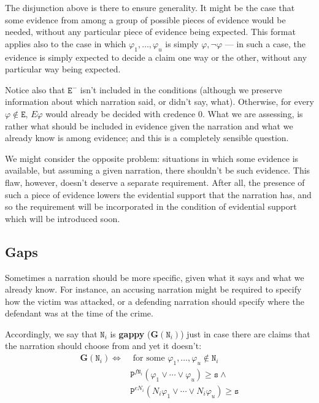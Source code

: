 \documentclass[10pt,leqno]{article}
\newcommand{\n}{\neg}
\begin{document}
The disjunction above is there to ensure generality. It might be the case that some evidence from among a group of possible pieces of evidence would be needed, without any particular piece of evidence being expected. This format applies also to the case in which $\varphi_1, \dots, \varphi_u$ is simply $\varphi, \n \varphi$ --- in such a case, the evidence is simply expected to decide a claim one way or the other, without any particular way being expected.

Notice also that $\mathtt{E}^-$ isn't included in the conditions (although we preserve information about which narration said, or didn't say, what). Otherwise, for every $\varphi\not \in \mathtt{E}$, $E\varphi$ would already be decided with credence 0. What we are assessing, is rather what should be included in evidence given the narration and what we already know is among evidence; and this is a completely sensible question.

We might consider the opposite problem: situations in which some evidence is available, but assuming a given narration, there shouldn't be such evidence. This flaw, however, doesn't deserve a separate requirement. After all, the presence of such a piece of evidence lowers the evidential support that the narration has, and so the requirement will be incorporated in the condition of evidential support which will be introduced soon. 





\subsection{Gaps}


Sometimes a narration should be more specific, given what it says and what we already know. For instance, an accusing narration might be required to specify how the victim was attacked, or a defending narration should specify where the defendant was at the time of the crime. 

 Accordingly, we say that $\mathtt{N}_i$ is \textbf{gappy}  ($\mathbf{G}(\mathtt{N}_i)$)  just in case there are claims that the narration should choose from and yet it doesn't:
\begin{align}
\tag{Gap} \label{Gap}
\mathbf{G}(\mathtt{N}_i)  \Leftrightarrow & \mbox{ for some } \varphi_1, \dots, \varphi_u \not \in \mathtt{N}_i\\ \nonumber
 &  \mathtt{P}^{f\mathtt{N}_i}(\varphi_1 \vee\cdots \vee \varphi_u)\geq \mathtt{s} \wedge\\ \nonumber
& \mathtt{P}^{eN_i}(N_i\varphi_1\vee \cdots \vee N_i\varphi_u)\geq \mathtt{s} 
\end{align}
\end{document}
